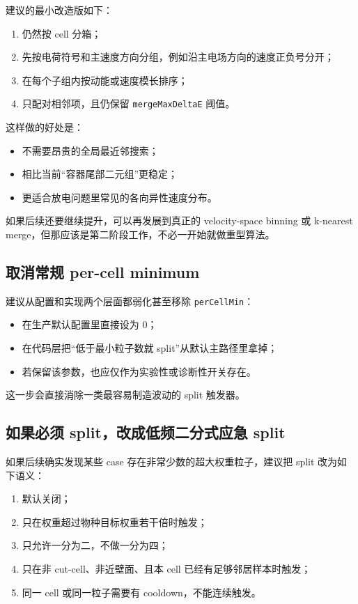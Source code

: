 \documentclass[UTF8,11pt,a4paper]{ctexart}
\begin{document}
建议的最小改造版如下：
\begin{enumerate}[itemsep=3pt]
  \item 仍然按 cell 分箱；
  \item 先按电荷符号和主速度方向分组，例如沿主电场方向的速度正负号分开；
  \item 在每个子组内按动能或速度模长排序；
  \item 只配对相邻项，且仍保留 \texttt{mergeMaxDeltaE} 阈值。
\end{enumerate}

这样做的好处是：
\begin{itemize}[itemsep=2pt]
  \item 不需要昂贵的全局最近邻搜索；
  \item 相比当前“容器尾部二元组”更稳定；
  \item 更适合放电问题里常见的各向异性速度分布。
\end{itemize}

如果后续还要继续提升，可以再发展到真正的 velocity-space binning 或 k-nearest merge，但那应该是第二阶段工作，不必一开始就做重型算法。

\subsection{取消常规 per-cell minimum}
建议从配置和实现两个层面都弱化甚至移除 \texttt{perCellMin}：
\begin{itemize}[itemsep=3pt]
  \item 在生产默认配置里直接设为 0；
  \item 在代码层把“低于最小粒子数就 split”从默认主路径里拿掉；
  \item 若保留该参数，也应仅作为实验性或诊断性开关存在。
\end{itemize}

这一步会直接消除一类最容易制造波动的 split 触发器。

\subsection{如果必须 split，改成低频二分式应急 split}
如果后续确实发现某些 case 存在非常少数的超大权重粒子，建议把 split 改为如下语义：
\begin{enumerate}[itemsep=3pt]
  \item 默认关闭；
  \item 只在权重超过物种目标权重若干倍时触发；
  \item 只允许一分为二，不做一分为四；
  \item 只在非 cut-cell、非近壁面、且本 cell 已经有足够邻居样本时触发；
  \item 同一 cell 或同一粒子需要有 cooldown，不能连续触发。
\end{enumerate}
\end{document}
